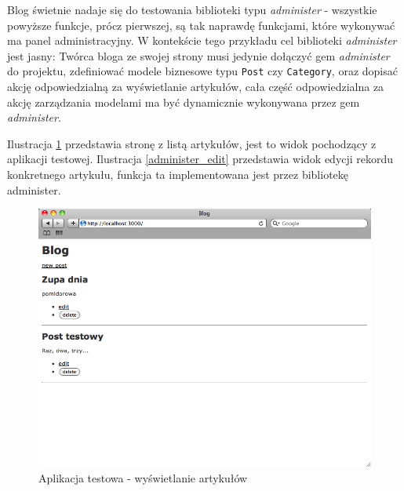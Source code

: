   Blog świetnie nadaje się do testowania biblioteki typu \emph{administer} - wszystkie powyższe funkcje, prócz pierwszej, są tak naprawdę funkcjami, które wykonywać ma panel administracyjny. W kontekście tego przykładu cel biblioteki \emph{administer} jest jasny: Twórca bloga ze swojej strony musi jedynie dołączyć gem \emph{administer} do projektu, zdefiniować modele biznesowe typu \texttt{Post} czy \texttt{Category}, oraz dopisać akcję odpowiedzialną za wyświetlanie artykułów, cała część odpowiedzialna za akcję zarządzania modelami ma być dynamicznie wykonywana przez gem \emph{administer}. 
  
  Ilustracja \ref{blog_view} przedstawia stronę z listą artykułów, jest to widok pochodzący z aplikacji testowej. Ilustracja \ref{administer_edit} przedstawia widok edycji rekordu konkretnego artykułu, funkcja ta implementowana jest przez bibliotekę administer.
  
  \vspace{5 mm}
  \begin{figure}[!h]
		\begin{center}
			\includegraphics[width=\linewidth]{images/blog.png}
			\caption{Aplikacja testowa - wyświetlanie artykułów}
			\label{blog_view}
		\end{center}
	\end{figure}
	
	\clearpage
	
